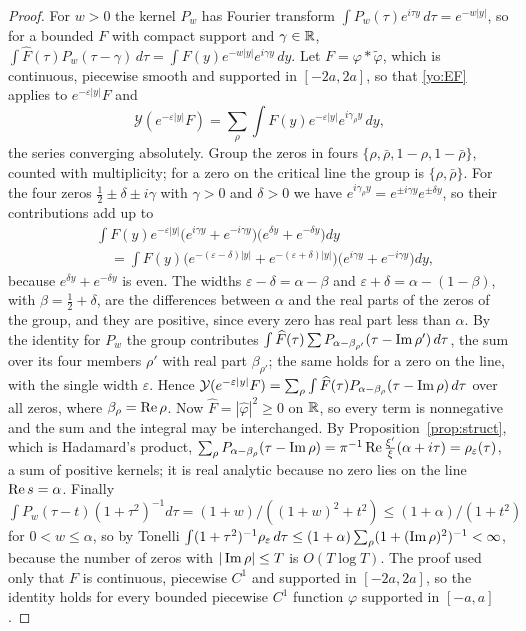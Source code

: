 \begin{proof}
For $w>0$ the kernel $P_w$ has Fourier transform $\int P_w(\tau)e^{i\tau y}\,d\tau=e^{-w|y|}$, so for a bounded $F$ with compact support and $\gamma\in\mathbb{R}$, $\int\widehat F(\tau)P_w(\tau-\gamma)\,d\tau=\int F(y)e^{-w|y|}e^{i\gamma y}\,dy$. Let $F=\varphi*\widetilde\varphi$, which is continuous, piecewise smooth and supported in $[-2a,2a]$, so that \eqref{yo:EF} applies to $e^{-\varepsilon|y|}F$ and
\[
\mathcal Y(e^{-\varepsilon|y|}F)=\sum_\rho\int F(y)e^{-\varepsilon|y|}e^{i\gamma_\rho y}\,dy,
\]
the series converging absolutely. Group the zeros in fours $\{\rho,\bar\rho,1-\rho,1-\bar\rho\}$, counted with multiplicity; for a zero on the critical line the group is $\{\rho,\bar\rho\}$. For the four zeros $\frac12\pm\delta\pm i\gamma$ with $\gamma>0$ and $\delta>0$ we have $e^{i\gamma_\rho y}=e^{\pm i\gamma y}e^{\pm\delta y}$, so their contributions add up to
\[
\begin{split}
&\int F(y)e^{-\varepsilon|y|}\bigl(e^{i\gamma y}+e^{-i\gamma y}\bigr)\bigl(e^{\delta y}+e^{-\delta y}\bigr)dy\\
&\quad=\int F(y)\bigl(e^{-(\varepsilon-\delta)|y|}+e^{-(\varepsilon+\delta)|y|}\bigr)\bigl(e^{i\gamma y}+e^{-i\gamma y}\bigr)dy,
\end{split}
\]
because $e^{\delta y}+e^{-\delta y}$ is even. The widths $\varepsilon-\delta=\alpha-\beta$ and $\varepsilon+\delta=\alpha-(1-\beta)$, with $\beta=\frac12+\delta$, are the differences between $\alpha$ and the real parts of the zeros of the group, and they are positive, since every zero has real part less than $\alpha$. By the identity for $P_w$ the group contributes $\int\widehat F(\tau)\sum P_{\alpha-\beta_{\rho'}}(\tau-\operatorname{Im}\rho')\,d\tau$, the sum over its four members $\rho'$ with real part $\beta_{\rho'}$; the same holds for a zero on the line, with the single width $\varepsilon$. Hence $\mathcal Y(e^{-\varepsilon|y|}F)=\sum_\rho\int\widehat F(\tau)P_{\alpha-\beta_\rho}(\tau-\operatorname{Im}\rho)\,d\tau$ over all zeros, where $\beta_\rho=\operatorname{Re}\rho$. Now $\widehat F=|\widehat\varphi|^2\ge0$ on $\mathbb{R}$, so every term is nonnegative and the sum and the integral may be interchanged. By Proposition~\ref{prop:struct}, which is Hadamard's product, $\sum_\rho P_{\alpha-\beta_\rho}(\tau-\operatorname{Im}\rho)=\pi^{-1}\operatorname{Re}\frac{\xi'}\xi(\alpha+i\tau)=\rho_\varepsilon(\tau)$, a sum of positive kernels; it is real analytic because no zero lies on the line $\operatorname{Re} s=\alpha$. Finally $\int P_w(\tau-t)(1+\tau^2)^{-1}d\tau=(1+w)/((1+w)^2+t^2)\le(1+\alpha)/(1+t^2)$ for $0<w\le\alpha$, so by Tonelli $\int(1+\tau^2)^{-1}\rho_\varepsilon\,d\tau\le(1+\alpha)\sum_\rho(1+(\operatorname{Im}\rho)^2)^{-1}<\infty$, because the number of zeros with $|\operatorname{Im}\rho|\le T$ is $O(T\log T)$. The proof used only that $F$ is continuous, piecewise $C^1$ and supported in $[-2a,2a]$, so the identity holds for every bounded piecewise $C^1$ function $\varphi$ supported in $[-a,a]$.
\end{proof}

